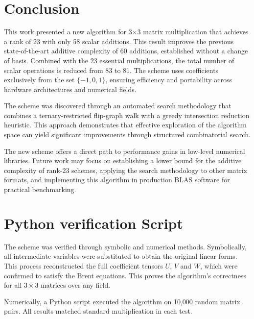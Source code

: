 \documentclass{article}
\begin{document}
\section{Conclusion}
\label{sec:conclusion}

This work presented a new algorithm for 3×3 matrix multiplication that achieves a rank of 23 with only 58 scalar additions. This result improves the previous state-of-the-art additive complexity of 60 additions, established without a change of basis. Combined with the 23 essential multiplications, the total number of scalar operations is reduced from 83 to 81. The scheme uses coefficients exclusively from the set $\{-1, 0, 1\}$, ensuring efficiency and portability across hardware architectures and numerical fields.

The scheme was discovered through an automated search methodology that combines a ternary-restricted flip-graph walk with a greedy intersection reduction heuristic. This approach demonstrates that effective exploration of the algorithm space can yield significant improvements through structured combinatorial search.

The new scheme offers a direct path to performance gains in low-level numerical libraries. Future work may focus on establishing a lower bound for the additive complexity of rank-23 schemes, applying the search methodology to other matrix formats, and implementing this algorithm in production BLAS software for practical benchmarking.

\appendix
\section{Python verification Script}
\label{app:verification}

The scheme was verified through symbolic and numerical methods. Symbolically, all intermediate variables were substituted to obtain the original linear forms. This process reconstructed the full coefficient tensors $U$, $V$ and $W$, which were confirmed to satisfy the Brent equations. This proves the algorithm's correctness for all $3 \times 3$ matrices over any field.

Numerically, a Python script executed the algorithm on 10,000 random matrix pairs. All results matched standard multiplication in each test.
\end{document}
